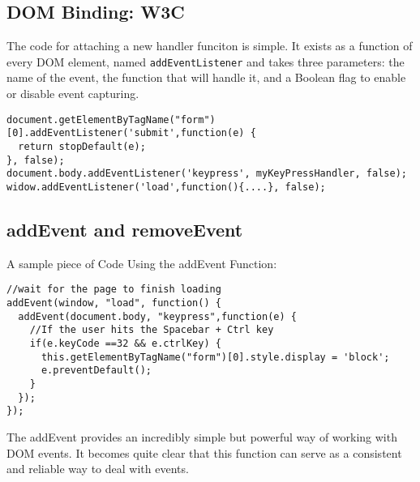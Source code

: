 \documentclass[a4paper,11pt]{book}
\begin{document}
\subsection{DOM Binding: W3C}
The code for attaching a new handler funciton is simple. It exists as a function
of every DOM element, named \verb|addEventListener| and takes three parameters:
the name of the event, the function that will handle it, and a Boolean flag to
enable or disable event capturing.
\begin{verbatim}
document.getElementByTagName("form")[0].addEventListener('submit',function(e) {
  return stopDefault(e);
}, false);
document.body.addEventListener('keypress', myKeyPressHandler, false);
widow.addEventListener('load',function(){....}, false);
\end{verbatim}
\subsection{addEvent and removeEvent}
A sample piece of Code Using the addEvent Function:
\begin{verbatim}
//wait for the page to finish loading
addEvent(window, "load", function() {
  addEvent(document.body, "keypress",function(e) {
    //If the user hits the Spacebar + Ctrl key
    if(e.keyCode ==32 && e.ctrlKey) {
      this.getElementByTagName("form")[0].style.display = 'block';
      e.preventDefault();
    }
  });
});
\end{verbatim}
The addEvent provides an incredibly simple but powerful way of working with DOM
events. It becomes quite clear that this function can serve as a consistent and
reliable way to deal with events.
\end{document}
